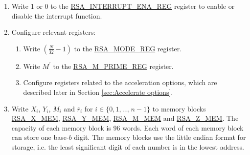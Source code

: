 \documentclass[main\_\_EN.tex]{subfiles}
\begin{document}
\begin{enumerate}

    \item Write 1 or 0 to the \hyperref[regdesc:RSAINTERRUPTENAREG]{RSA\_INTERRUPT\_ENA\_REG} register to enable or disable the interrupt function.
    
    \item Configure relevant registers:   
    
    \begin{enumerate}
        \item Write \begin{math}( \frac{N}{32} - 1 )\end{math} to the \hyperref[regdesc:RSAMODEXPMODEREG]{RSA\_MODE\_REG} register.
        
        \item Write \begin{math}M^{\prime}\end{math} to the \hyperref[regdesc:RSAMPRIMEREG]{RSA\_M\_PRIME\_REG} register.
        
        \item Configure registers related to the acceleration options, which are described later in Section \ref{sec:Accelerate options}.
        
    \end{enumerate}

    \item Write
        \begin{math}X_{i}\end{math},
        \begin{math}Y_{i}\end{math},
        \begin{math}M_{i}\end{math} and
        \begin{math}\overline{r}_{i}\end{math} for \begin{math}i \in \{ 0, 1, \dots, n-1 \} \end{math}
        to memory blocks \hyperref[regdesc:RSAmemory]{RSA\_X\_MEM}, \hyperref[regdesc:RSAmemory]{RSA\_Y\_MEM}, \hyperref[regdesc:RSAmemory]{RSA\_M\_MEM} and \hyperref[regdesc:RSAmemory]{RSA\_Z\_MEM}. The capacity of each memory block is 96 words. Each word of each memory block can store one base-\begin{math}b\end{math} digit. The memory blocks use the little endian format for storage, i.e. the least significant digit of each number is in the lowest address.
        

\end{enumerate}
\end{document}
